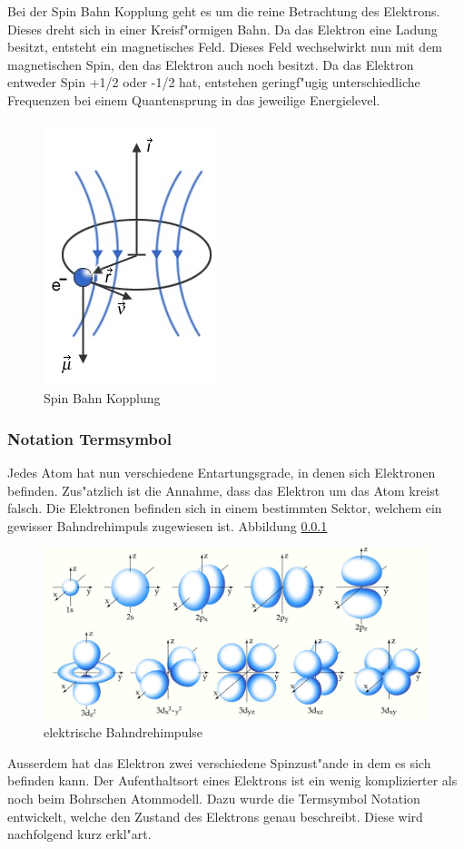 \begin{refsection}
Bei der Spin Bahn Kopplung geht es um die reine Betrachtung des
Elektrons.  Dieses dreht sich in einer Kreisf"ormigen Bahn.  Da das
Elektron eine Ladung besitzt, entsteht ein magnetisches Feld.  Dieses
Feld wechselwirkt nun mit dem magnetischen Spin, den das Elektron auch
noch besitzt.  Da das Elektron entweder Spin +1/2 oder -1/2 hat,
entstehen geringf"ugig unterschiedliche Frequenzen bei einem
Quantensprung in das jeweilige Energielevel.

\begin{figure}
	\centering
	\includegraphics[width=.2\columnwidth]{../vortrag/pictures/feinstrukturelektron.jpg}
	\caption{Spin Bahn Kopplung} %
	\label{atomuhr:spinbahn}
\end{figure}

\subsubsection{Notation Termsymbol}
Jedes Atom hat nun verschiedene Entartungsgrade, in denen sich
Elektronen befinden. Zus"atzlich ist die Annahme, dass das Elektron um
das Atom kreist falsch. Die Elektronen befinden sich in einem
bestimmten Sektor, welchem ein gewisser Bahndrehimpuls zugewiesen ist.
Abbildung \ref{}
\begin{figure}
	\centering
	\includegraphics[width = 0.8\columnwidth]{../vortrag/pictures/orbitale.JPG}
	\caption{elektrische Bahndrehimpulse} %
	\label{atomuhr:bahndrehimpuls}
\end{figure}
Ausserdem hat das Elektron zwei verschiedene Spinzust"ande in dem es
sich befinden kann. Der Aufenthaltsort eines Elektrons ist ein wenig
komplizierter als noch beim Bohrschen Atommodell.  Dazu wurde die
Termsymbol Notation entwickelt, welche den Zustand des Elektrons genau
beschreibt.  Diese wird nachfolgend kurz erkl"art.


\end{refsection}
